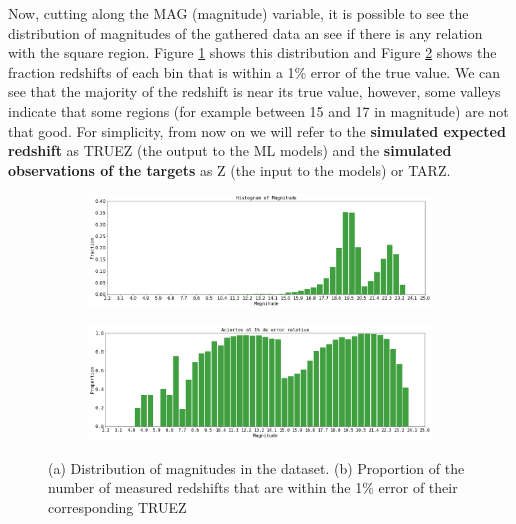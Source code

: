 Now, cutting along the MAG (magnitude) variable, it is possible to see the distribution of magnitudes of the gathered data an see if there is any relation with the square region. Figure \ref{fig:mag-dist} shows this distribution and Figure \ref{fig:mag-prop-dist} shows the fraction redshifts of each bin that is within a 1\% error of the true value. We can see that the majority of the redshift is near its true value, however, some valleys indicate that some regions (for example between 15 and 17 in magnitude) are not that good. For simplicity, from now on we will refer to the \textbf{simulated expected redshift} as TRUEZ (the output to the ML models) and the \textbf{simulated observations of the targets} as Z (the input to the models) or TARZ.
\begin{figure}
	\centering
	\begin{subfigure}[b]{1.0\textwidth}
		\includegraphics[width=1\linewidth]{TeX_files/Imagenes/mag-dist}
		\caption{}
		\label{fig:mag-dist} 
	\end{subfigure}    
	\begin{subfigure}[b]{1.0\textwidth}
		\includegraphics[width=1\linewidth]{TeX_files/Imagenes/mag-prop-dist}
		\caption{}
		\label{fig:mag-prop-dist}
	\end{subfigure}
	\caption{(a) Distribution of magnitudes in the dataset. (b) Proportion of the number of measured redshifts that are within the 1\% error of their corresponding TRUEZ }
	\label{fig:mag-dist-both}
\end{figure}
